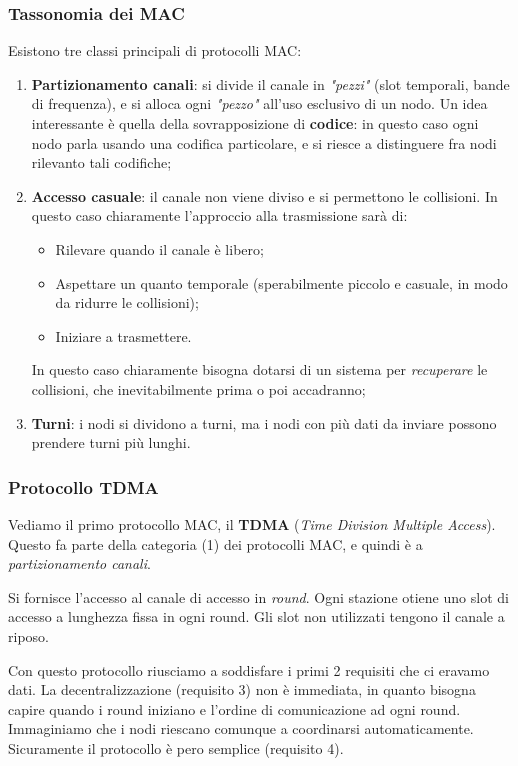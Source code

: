 \documentclass[a4paper,11pt]{article}
\begin{document}
\subsubsection{Tassonomia dei MAC}
Esistono tre classi principali di protocolli MAC:
\begin{enumerate}
	\item \textbf{Partizionamento canali}: si divide il canale in \textit{"pezzi"} (slot temporali, bande di frequenza), e si alloca ogni \textit{"pezzo"} all'uso esclusivo di un nodo.
		Un idea interessante è quella della sovrapposizione di \textbf{codice}: in questo caso ogni nodo parla usando una codifica particolare, e si riesce a distinguere fra nodi rilevanto tali codifiche;
	\item \textbf{Accesso casuale}: il canale non viene diviso e si permettono le collisioni. In questo caso chiaramente l'approccio alla trasmissione sarà di:
		\begin{itemize}
			\item Rilevare quando il canale è libero;
			\item Aspettare un quanto temporale (sperabilmente piccolo e casuale, in modo da ridurre le collisioni);
			\item Iniziare a trasmettere.
		\end{itemize}

		In questo caso chiaramente bisogna dotarsi di un sistema per \textit{recuperare} le collisioni, che inevitabilmente prima o poi accadranno;
	\item \textbf{Turni}: i nodi si dividono a turni, ma i nodi con più dati da inviare possono prendere turni più lunghi.
\end{enumerate}

\subsubsection{Protocollo TDMA}
Vediamo il primo protocollo MAC, il \textbf{TDMA} (\textit{Time Division Multiple Access}). Questo fa parte della categoria (1) dei protocolli MAC, e quindi è a \textit{partizionamento canali}. 

Si fornisce l'accesso al canale di accesso in \textit{round}.
Ogni stazione otiene uno slot di accesso a lunghezza fissa in ogni round.
Gli slot non utilizzati tengono il canale a riposo.

Con questo protocollo riusciamo a soddisfare i primi 2 requisiti che ci eravamo dati. La decentralizzazione (requisito 3) non è immediata, in quanto bisogna capire quando i round iniziano e l'ordine di comunicazione ad ogni round.
Immaginiamo che i nodi riescano comunque a coordinarsi automaticamente.
Sicuramente il protocollo è pero semplice (requisito 4).
\end{document}
